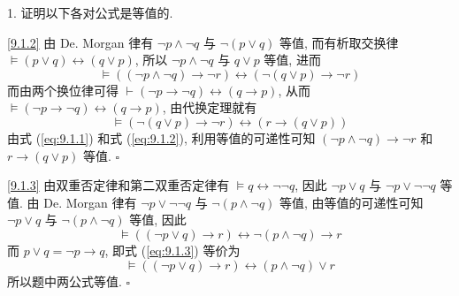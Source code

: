 \documentclass[boxes]{homework}
\begin{document}
\setlength\abovedisplayskip{.1em}
\setlength\belowdisplayskip{.1em}
\begin{problem}
1. 证明以下各对公式是等值的.
\end{problem}

\begin{solution}
    \ref{9.1.2} 由 De. Morgan 律有 $\lnot p\land\lnot q$ 与 $\lnot(p\lor q)$ 等值, 而有析取交换律 $\vDash (p\lor q)\leftrightarrow(q\lor p)$, 所以 $\lnot p\land\lnot q$ 与 $q\lor p$ 等值, 进而
    \begin{equation}\label{eq:9.1.1}
        \vDash ((\lnot p\land\lnot q)\to \lnot r)\leftrightarrow(\lnot(q\lor p)\to \lnot r)
    \end{equation}
    而由两个换位律可得 $\vdash (\lnot p\to\lnot q)\leftrightarrow(q\to p)$, 从而 $\vDash (\lnot p\to\lnot q)\leftrightarrow(q\to p)$, 由代换定理就有
    \begin{equation}\label{eq:9.1.2}
        \vDash (\lnot(q\lor p)\to \lnot r)\leftrightarrow(r\to(q\lor p))
    \end{equation}
    由式 (\ref{eq:9.1.1}) 和式 (\ref{eq:9.1.2}), 利用等值的可递性可知 $(\lnot p\land \lnot q)\to\lnot r$ 和 $r\to (q\lor p)$ 等值. $\square$

    \ref{9.1.3} 由双重否定律和第二双重否定律有 $\vDash q\leftrightarrow\lnot\lnot q$, 因此 $\lnot p\lor q$ 与 $\lnot p\lor \lnot\lnot q$ 等值. 由 De. Morgan 律有 $\lnot p\lor \lnot\lnot q$ 与 $\lnot (p\land \lnot q)$ 等值, 由等值的可递性可知 $\lnot p\lor q$ 与 $\lnot(p\land \lnot q)$ 等值, 因此
    \begin{equation}\label{eq:9.1.3}
        \vDash ((\lnot p\lor q)\to r)\leftrightarrow \lnot(p\land\lnot q)\to r
    \end{equation}
    而 $p\lor q = \lnot p\to q$, 即式 (\ref{eq:9.1.3}) 等价为
    \begin{equation}
        \vDash ((\lnot p\lor q)\to r)\leftrightarrow (p\land\lnot q)\lor r
    \end{equation}
    所以题中两公式等值. $\square$
\end{solution}
\end{document}
